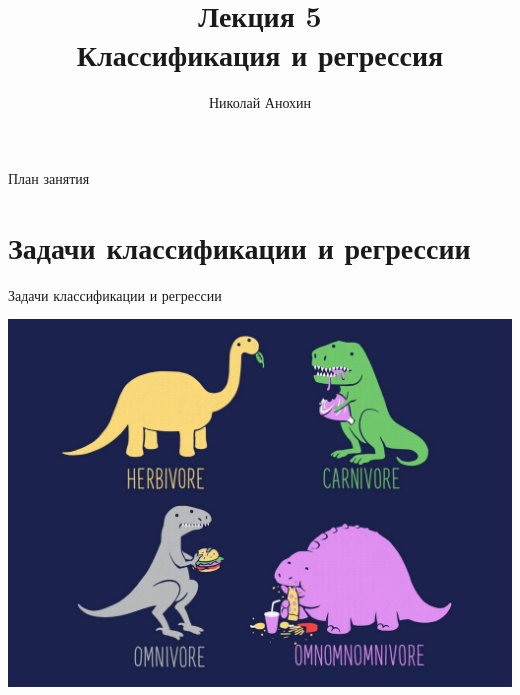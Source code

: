 \documentclass[aspectratio=169]{beamer}
\author{Николай Анохин}
\title{\newline \newline \newline Лекция 5 \\ Классификация и регрессия}
\let\otp\titlepage
\renewcommand{\titlepage}{\otp\addtocounter{framenumber}{-1}}
\begin{document}
\begin{frame}[plain]
\titlepage
\end{frame}

\begin{frame}{План занятия}
\tableofcontents
\end{frame}

\section{Задачи классификации и регрессии}

\begin{frame}{}

\begin{center}
\Large Задачи классификации и регрессии

\vspace{1em}
\includegraphics[height=0.7\textheight]{images/omnomnom.jpg}
\end{center}

\end{frame}
\end{document}
